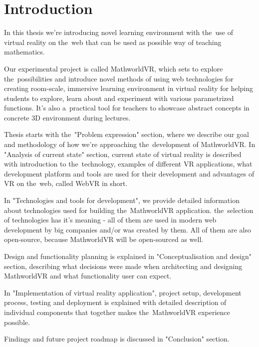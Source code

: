 \setcounter{page}{1}
\setcounter{equation}{0}
\setcounter{figure}{0}
\setcounter{table}{0}

\section*{Introduction}
In this thesis we're introducing novel learning environment with the~use of virtual reality on the~web that can be used as possible way of teaching mathematics.

Our experimental project is called MathworldVR, which sets to explore the~possibilities and introduce novel methods of using web technologies for creating room-scale, immersive learning environment in virtual reality for helping students to explore, learn about and experiment with various parametrized functions. It’s also a~practical tool for teachers to showcase abstract concepts in concrete 3D environment during lectures.

Thesis starts with the~"Problem expression" section, where we describe our goal and methodology of how we're approaching the~development of MathworldVR. In "Analysis of current state" section, current state of virtual reality is described with introduction to the~technology, examples of different VR applications, what development platform and tools are used for their development and advantages of VR on the~web, called WebVR in short.

In "Technologies and tools for development", we provide detailed information about technologies used for building the~MathworldVR application. the~selection of technologies has it's meaning - all of them are used in modern web development by big companies and/or was created by them. All of them are also open-source, because MathworldVR will be open-sourced as well.

Design and functionality planning is explained in "Conceptualisation and design" section, describing what decisions were made when architecting and designing MathworldVR and what functionality user can expect.

In "Implementation of virtual reality application", project setup, development process, testing and deployment is explained with detailed description of individual components that together makes the~MathworldVR experience possible.

Findings and future project roadmap is discussed in "Conclusion" section.
